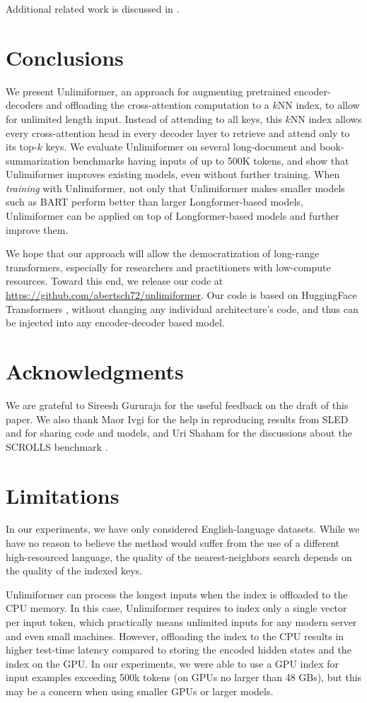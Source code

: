 \documentclass{article}
\newcommand{\ours}{Unlimiformer\xspace}
\begin{document}
Additional related work is discussed in .


\section{Conclusions}
We present \ours{}, an approach for augmenting pretrained encoder-decoders and offloading the cross-attention computation to a $k$NN index, to allow for unlimited length input.
Instead of attending to all keys, this $k$NN index allows every cross-attention head in every decoder layer to retrieve and attend only to its top-$k$ keys.
We evaluate \ours on several long-document and book-summarization benchmarks having inputs of up to 500K tokens, and show that \ours improves existing models, even without further training. When \emph{training} with \ours, not only that \ours makes smaller models such as BART perform better than larger Longformer-based models, \ours can be applied on top of Longformer-based models and further improve them.


We hope that our approach will allow the democratization of long-range transformers, especially for researchers and practitioners with low-compute resources.
Toward this end, we release our code at \url{https://github.com/abertsch72/unlimiformer}. 
Our code is based on HuggingFace Transformers \citep{wolf-etal-2020-transformers}, without changing any individual architecture's code, and thus can be injected into any encoder-decoder based model.

\section*{Acknowledgments}
We are grateful to Sireesh Gururaja for the useful feedback on the draft of this paper.
We also thank Maor Ivgi for the help in reproducing results from SLED \citep{sled} and for sharing code and models, and Uri Shaham for the discussions about the SCROLLS benchmark \citep{scrolls}.

\section*{Limitations}
In our experiments, we have only considered English-language datasets. While we have no reason to believe the method would suffer from the use of a different high-resourced language,  the quality of the nearest-neighbors search depends on the quality of the indexed keys. %


\ours can process the longest inputs when the index is offloaded to the CPU memory. In this case, \ours requires to index only a single vector per input token, which practically means unlimited inputs for any modern server and even small machines.
However, offloading the index to the CPU results in higher test-time latency compared to storing the encoded hidden states and the index on the GPU.
In our experiments, we were able to use a GPU index for input examples exceeding 500k tokens (on GPUs no larger than 48 GBs), but this may be a concern when using smaller GPUs or larger models.
\end{document}
